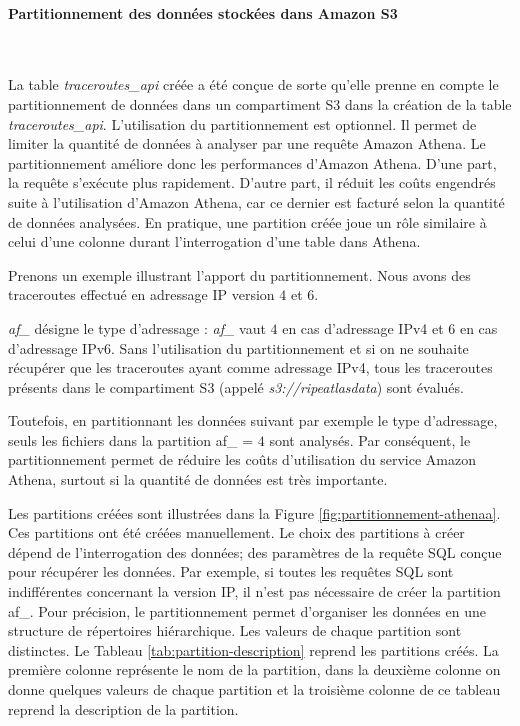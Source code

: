 \paragraph{Partitionnement des données stockées dans Amazon S3}~

La table \textit{traceroutes\_api} créée a été conçue de sorte qu'elle prenne en compte  le partitionnement de données dans un compartiment S3 dans la création de la table \textit{traceroutes\_api}.  L'utilisation du partitionnement est optionnel. 
Il permet de limiter la quantité de données à analyser par une requête Amazon Athena. Le partitionnement améliore donc les performances d'Amazon Athena. D'une part, la requête s'exécute plus rapidement. D'autre part, il réduit les coûts engendrés  suite à l'utilisation d'Amazon Athena, car ce dernier est facturé selon la quantité de données analysées. En pratique,  une partition créée joue un rôle similaire à celui d'une colonne durant l'interrogation d'une table dans Athena. 

Prenons un exemple illustrant l'apport du partitionnement. Nous avons des traceroutes effectué en adressage IP  version  $ 4 $ et $ 6 $.


\textit{af\_} désigne le type d'adressage : \textit{af\_} vaut $4$ en cas d'adressage IPv4 et $6$ en cas d'adressage IPv6. Sans l'utilisation du partitionnement et si on ne souhaite récupérer que  les traceroutes ayant comme adressage IPv4, tous les traceroutes présents dans le compartiment S3 (appelé \textit{s3://ripeatlasdata}) sont évalués.

Toutefois, en partitionnant les données suivant par exemple le type d'adressage, seuls les fichiers dans la partition
af\_ = $4$  sont analysés. Par conséquent, le partitionnement permet de réduire les coûts d'utilisation du service Amazon Athena, surtout si la quantité de données est très importante. 


Les partitions   créées sont illustrées  dans la Figure 	\ref{fig:partitionnement-athenaa}. Ces partitions ont été créées manuellement. Le choix des partitions à créer  dépend de l'interrogation des données; des paramètres de la requête SQL conçue pour récupérer  les données. Par exemple, si toutes les requêtes SQL  sont indifférentes concernant la version IP, il n'est pas nécessaire de créer la partition af\_. Pour précision, le partitionnement permet  d'organiser les données en une structure de répertoires hiérarchique. Les valeurs de chaque partition sont distinctes.
Le  Tableau \ref{tab:partition-description} 
reprend les  partitions créés.  La première colonne représente le nom de la partition, dans 
la deuxième colonne on donne quelques valeurs de chaque partition et la troisième colonne de ce tableau reprend la description de la partition.

